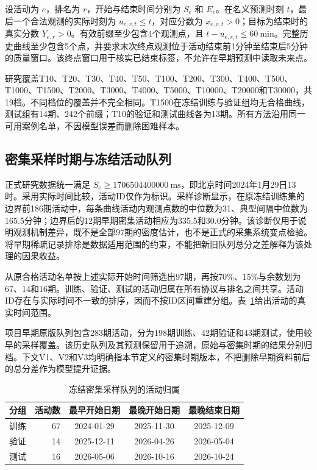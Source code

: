 \documentclass[a4paper,11pt,fontset=none]{ctexart}
\begin{document}
设活动为 \(e\)，排名为 \(r\)，开始与结束时间分别为 \(S_e\) 和 \(E_e\)。在名义预测时刻 \(t\)，最后一个合法观测的实际时刻为 \(u_{e,r,t}\leq t\)，对应分数为 \(x_{e,r,t}>0\)；目标为结束时的真实分数 \(Y_{e,r}>0\)。有效前缀至少包含4个观测点，且 \(t-u_{e,r,t}\leq60\ \mathrm{min}\)。完整历史曲线至少包含5个点，并要求末次终点观测位于活动结束前1分钟至结束后5分钟的质量窗口。该终点窗口用于核实已结束标签，不允许在早期预测中读取未来点。

研究覆盖T10、T20、T30、T40、T50、T100、T200、T300、T400、T500、T1000、T1500、T2000、T3000、T4000、T5000、T10000、T20000和T30000，共19档。不同档位的覆盖并不完全相同。T1500在冻结训练与验证组均无合格曲线，测试组有14期、242个前缀；T10的验证和测试曲线各为13期。所有方法沿用同一可用案例名单，不因模型误差而删除困难样本。

\subsection{密集采样时期与冻结活动队列}

正式研究数据统一满足 \(S_e\geq1706504400000\ \mathrm{ms}\)，即北京时间2024年1月29日13时。采用实际时间比较，活动ID仅作为标识。采样诊断显示，在原冻结训练集的边界前186期活动中，每条曲线活动内观测点数的中位数为31、典型间隔中位数为165.5分钟；边界后的12期早期密集活动相应为335.5和30.0分钟。该诊断仅用于说明观测机制差异，既不是全部97期的密度估计，也不是正式的采集系统变点检验。将早期稀疏记录排除是数据适用范围的约束，不能把新旧队列总分之差解释为该处理的因果收益。

从原合格活动名单按上述实际开始时间筛选出97期，再按70\%、15\%与余数划为67、14和16期。训练、验证、测试的活动归属在所有协议与排名之间共享。活动ID存在与实际时间不一致的排序，因而不按ID区间重建分组。表~\ref{tab:cohort}给出活动的真实时间范围。

项目早期原版队列包含283期活动，分为198期训练、42期验证和43期测试，使用较早的采样覆盖。该历史队列及其预测保留用于追溯，原始与密集时期的结果分别归档。下文V1、V2和V3均明确指本节定义的密集时期版本，不把删除早期资料前后的总分差作为模型提升证据。

\begin{table}[!htbp]
\centering
\caption{冻结密集采样队列的活动归属}\label{tab:cohort}
\small
\setlength{\tabcolsep}{4pt}
\renewcommand{\arraystretch}{1.18}
\begin{tabular}{l r c c c}
\toprule
分组 & 活动数 & 最早开始日期 & 最晚开始日期 & 最晚结束日期 \\
\midrule
训练 & 67 & 2024-01-29 & 2025-11-30 & 2025-12-09 \\
验证 & 14 & 2025-12-11 & 2026-04-26 & 2026-05-04 \\
测试 & 16 & 2026-05-06 & 2026-10-16 & 2026-10-24 \\
\bottomrule
\end{tabular}
\end{table}
\end{document}
